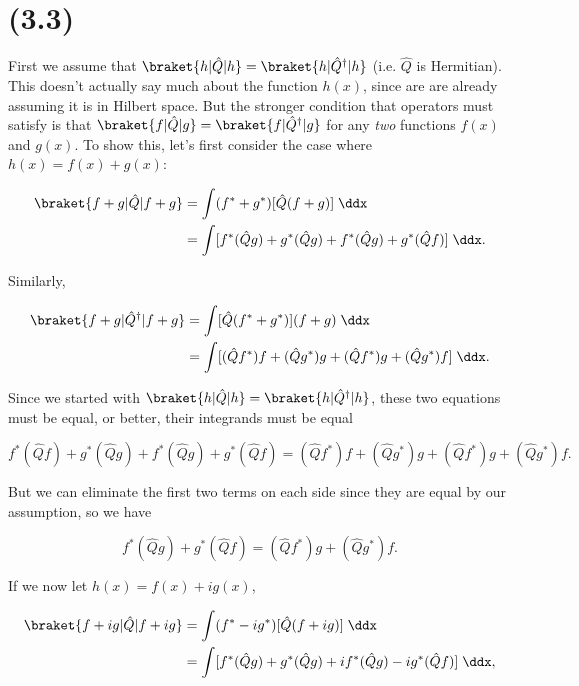 \section{(3.3)}

First we assume that $\braket{h|\hat{Q}|h} = \braket{h|\hat{Q}^{\dagger}|h}$ (i.e. $\hat{Q}$ is Hermitian). This doesn't actually say much about the function $h(x)$, since are are already assuming it is in Hilbert space. But the stronger condition that operators must satisfy is that $\braket{f|\hat{Q}|g} = \braket{f|\hat{Q}^{\dagger}|g}$ for any \textit{two} functions $f(x)$ and $g(x)$. To show this, let's first consider the case where $h(x) = f(x) + g(x)$:

\begin{align*}
    \braket{f+g|\hat{Q}|f+g} &= \int(f^* + g^*)[\hat{Q}(f + g)]\;\ddx \\
    &= \int[f^*(\hat{Q}g) + g^*(\hat{Q}g) + f^*(\hat{Q}g) + g^*(\hat{Q}f)]\;\ddx.
\end{align*}

Similarly,

\begin{align*}
    \braket{f+g|\hat{Q}^{\dagger}|f+g} &= \int[\hat{Q}(f^* + g^*)](f + g)\;\ddx \\
    &= \int[(\hat{Q}f^*)f + (\hat{Q}g^*)g + (\hat{Q}f^*)g + (\hat{Q}g^*)f]\;\ddx.
\end{align*}

Since we started with $\braket{h|\hat{Q}|h} = \braket{h|\hat{Q}^{\dagger}|h}$, these two equations must be equal, or better, their integrands must be equal

\begin{equation*}
    f^*(\hat{Q}f) + g^*(\hat{Q}g) + f^*(\hat{Q}g) + g^*(\hat{Q}f) = (\hat{Q}f^*)f + (\hat{Q}g^*)g + (\hat{Q}f^*)g + (\hat{Q}g^*)f.
\end{equation*}

But we can eliminate the first two terms on each side since they are equal by our assumption, so we have

\begin{equation*}
    f^*(\hat{Q}g) + g^*(\hat{Q}f) = (\hat{Q}f^*)g + (\hat{Q}g^*)f.
\end{equation*}

If we now let $h(x) = f(x) + ig(x)$,

\begin{align*}
    \braket{f+ig|\hat{Q}|f+ig} &= \int(f^* - ig^*)[\hat{Q}(f + ig)]\;\ddx \\
    &= \int[f^*(\hat{Q}g) + g^*(\hat{Q}g) + if^*(\hat{Q}g) - ig^*(\hat{Q}f)]\;\ddx,
\end{align*}

